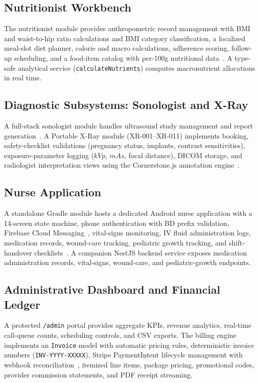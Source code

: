 \documentclass[conference]{IEEEtran}
\begin{document}
\subsection{Nutritionist Workbench}
The nutritionist module provides anthropometric record management with BMI and waist-to-hip ratio calculations and BMI category classification, a localized meal-slot diet planner, calorie and macro calculations, adherence scoring, follow-up scheduling, and a food-item catalog with per-100g nutritional data~\cite{srs2026}. A type-safe analytical service (\texttt{calculateNutrients}) computes macronutrient allocations in real time.

\subsection{Diagnostic Subsystems: Sonologist and X-Ray}
A full-stack sonologist module handles ultrasound study management and report generation~\cite{dicom2021}. A Portable X-Ray module (XR-001--XR-011) implements booking, safety-checklist validations (pregnancy status, implants, contrast sensitivities), exposure-parameter logging ($kVp$, $mAs$, focal distance), DICOM storage, and radiologist interpretation views using the Cornerstone.js annotation engine~\cite{dicom2021, pacs2001}.

\subsection{Nurse Application}
A standalone Gradle module hosts a dedicated Android nurse application with a 14-screen state machine, phone authentication with BD prefix validation, Firebase Cloud Messaging~\cite{firebase2024fcm}, vital-signs monitoring, IV fluid administration logs, medication records, wound-care tracking, pediatric growth tracking, and shift-handover checklists~. A companion NestJS backend service exposes medication administration records, vital-signs, wound-care, and pediatric-growth endpoints.

\subsection{Administrative Dashboard and Financial Ledger}
A protected \texttt{/admin} portal provides aggregate KPIs, revenue analytics, real-time call-queue counts, scheduling controls, and CSV exports. The billing engine implements an \texttt{Invoice} model with automatic pricing rules, deterministic invoice numbers (\texttt{INV-YYYY-XXXXX}), Stripe PaymentIntent lifecycle management with webhook reconciliation~\cite{stripe2024api}, itemized line items, package pricing, promotional codes, provider commission statements, and PDF receipt streaming.
\end{document}
